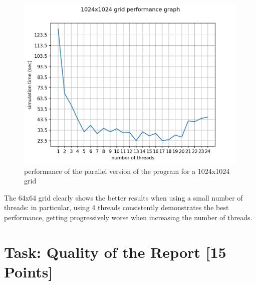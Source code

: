 \documentclass[unicode,11pt,a4paper,oneside,numbers=endperiod,openany]{scrartcl}
\begin{document}
\begin{figure}[H]
\centering
\includegraphics[width=0.8\linewidth]{1024manualplot.png}
\caption{performance of the parallel version of the program for a 1024x1024 grid}
\end{figure}

The 64x64 grid clearly shows the better results when using a small number of threads: in particular, using 4 threads consistently demonstrates the best performance, getting progressively worse when increasing the number of threads.


\section{Task:  Quality of the Report  [15 Points]}
\end{document}
